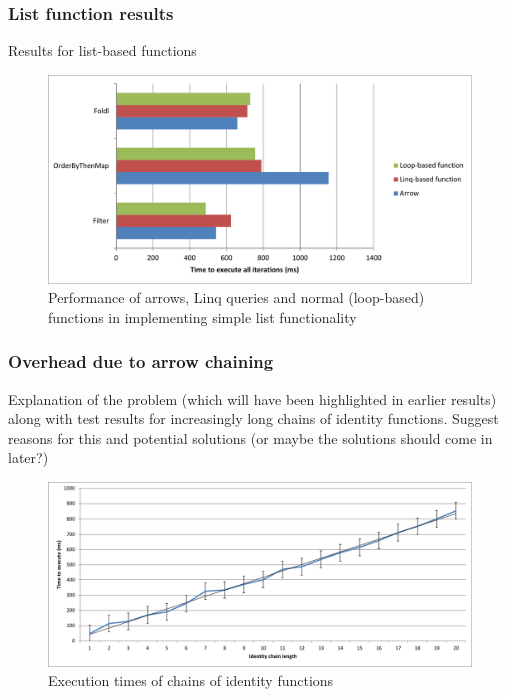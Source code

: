 \documentclass[12pt,twoside,notitlepage]{report}
\begin{document}
\subsubsection{List function results}

Results for list-based functions

\begin{figure}[!ht]
  \centering
  \includegraphics[width=\textwidth]{fig/ListFunctionPerformanceChart.pdf}
  \caption{Performance of arrows, Linq queries and normal (loop-based) functions in implementing simple list functionality}
  \label{fig:list_function_performance}
\end{figure}

\subsubsection{Overhead due to arrow chaining}
\label{sec:arrow_chaining_overhead}

Explanation of the problem (which will have been highlighted in earlier results) along with test results for increasingly long chains of identity functions. Suggest reasons for this and potential solutions (or maybe the solutions should come in later?)

\begin{figure}[!ht]
  \centering
  \includegraphics[width=\textwidth]{fig/IdentityChains.pdf}
  \caption{Execution times of chains of identity functions}
  \label{fig:arrow_chaining_overhead}
\end{figure}
\end{document}
